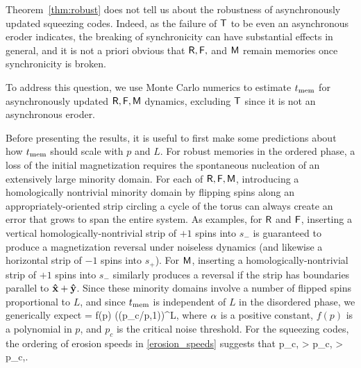 \documentclass[pra,aps,twocolumn,groupedaddress,superscriptaddress,nofootinbib,preprintnumbers]{revtex4-2}
\begin{document}
	Theorem~\ref{thm:robust} does not tell us about the robustness of asynchronously updated squeezing codes. Indeed, as the failure of $\mathsf{T}$ to be even an asynchronous eroder indicates, the breaking of synchronicity can have substantial effects in general, and it is not a priori obvious that $\mathsf{R},\mathsf{F},$ and $\mathsf{M}$ remain memories once synchronicity is broken. 
	
	To address this question, we use Monte Carlo numerics to estimate $t_{\rm mem}$ for asynchronously updated $\mathsf{R},\mathsf{F},\mathsf{M}$ dynamics, excluding $\mathsf{T}$ since it is not an asynchronous eroder. 
	
	Before presenting the results, it is useful to first make some predictions about how $t_{\rm mem}$ should scale with $p$ and $L$. For robust memories in the ordered phase, a loss of the initial magnetization requires the spontaneous nucleation of an extensively large minority domain. For each of $\mathsf{R},\mathsf{F},\mathsf{M}$, introducing a homologically nontrivial minority domain by flipping spins along an appropriately-oriented strip circling a cycle of the torus can always create an error that grows to span the entire system. As examples, for $\mathsf{R}$ and $\mathsf{F}$, inserting a vertical homologically-nontrivial strip of $+1$ spins into $s_-$ is guaranteed to produce a magnetization reversal under noiseless dynamics (and likewise a horizontal strip of $-1$ spins into $s_+$). For $\mathsf{M}$, inserting a homologically-nontrivial strip of $+1$ spins into $s_-$ similarly produces a reversal if the strip has boundaries parallel to ${\mathbf{\hat x}}+{\mathbf{\hat y}}$. Since these minority domains involve a number of flipped spins proportional to $L$, and since $t_{\rm mem}$ is independent of $L$ in the disordered phase, we generically expect 
	\be \tmem = f(p) \cdot (\max(p_c/p,1))^{\a L},\ee 
	where $\alpha$ is a positive constant, $f(p)$ is a polynomial in $p$, and $p_c$ is the critical noise threshold. For the squeezing codes, the ordering of erosion speeds in \eqref{erosion_speeds} suggests that 
	\be \label{pc_ordering} p_{c,\sfR} > p_{c,\sfF} > p_{c,\sfM}.\ee 
	
\end{document}
